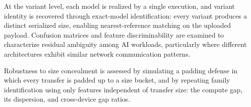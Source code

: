 At the variant level, each model is realized by a single execution, and variant
identity is recovered through exact-model identification: every variant produces
a distinct serialized size, enabling nearest-reference matching on the uploaded
payload. Confusion matrices and feature discriminability are examined to
characterize residual ambiguity among AI workloads, particularly where different
architectures exhibit similar network communication patterns.

Robustness to size concealment is assessed by simulating a padding defense in
which every transfer is padded up to a size bucket, and by repeating family
identification using only features independent of transfer size: the compute
gap, its dispersion, and cross-device gap ratios.
